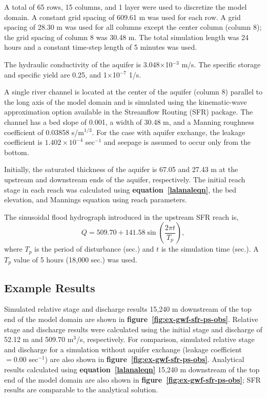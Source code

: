 A total of 65 rows, 15 columns, and 1 layer were used to discretize the model domain. A constant grid spacing of 609.61 m was used for each row. A grid spacing of 28.30 m was used for all columns except the center column (column 8); the grid spacing of column 8 was 30.48 m. The total simulation length was 24 hours and a constant time-step length of 5 minutes was used.

The hydraulic conductivity of the aquifer is 3.048$\times$10$^{-3}$ m/s. The specific storage and specific yield are 0.25, and 1$\times$10$^{-7}$ 1/s.
 


A single river channel is located at the center of the aquifer (column 8) parallel to the long axis of the model domain and is simulated using the kinematic-wave approximation option available in the Streamflow Routing (SFR) package. The channel has a bed slope of 0.001, a width of 30.48 m, and a Manning roughness coefficient of 0.03858 s/m$^{1/3}$. For the case with aquifer exchange, the leakage coefficient is $1.402 \times 10^{-4}$ sec$^{-1}$ and seepage is assumed to occur only from the bottom.

Initially, the saturated thickness of the aquifer is 67.05 and 27.43 m at the upstream and downstream ends of the aquifer, respectively. The initial reach stage in each reach was calculated using \textbf{equation~\ref{lalanaleqn}}, the bed elevation, and Mannings equation using reach parameters.




The sinusoidal flood hydrograph introduced in the upstream SFR reach is,
\nolinebreak
\begin{equation} \label{lalhydrographeqn}
Q = 509.70 + 141.58 \sin \left( \frac{2 \pi t}{T_p} \right),
\end{equation}
\noindent
where $T_p$ is the period of disturbance (sec.) and $t$ is the simulation time (sec.). A $T_p$ value of 5 hours (18,000 sec.) was used.

\subsection{Example Results}

Simulated relative stage and discharge results 15,240 m downstream of the top end of the model domain are shown in \textbf{figure~\ref{fig:ex-gwf-sfr-ps-obs}}. Relative stage and discharge results were calculated using the initial stage and discharge of 52.12 m and 509.70 m$^3$/s, respectively. For comparison, simulated relative stage and discharge for a simulation without aquifer exchange (leakage coefficient $= 0.00$ sec$^{-1}$) are also shown in  \textbf{figure~\ref{fig:ex-gwf-sfr-ps-obs}}. Analytical results calculated using \textbf{equation~\ref{lalanaleqn}} 15,240 m downstream of the top end of the model domain are also shown in \textbf{figure~\ref{fig:ex-gwf-sfr-ps-obs}}; SFR results are comparable to the analytical solution.


